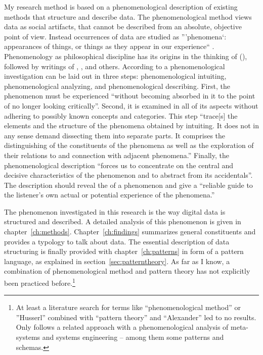 My research method is based on a phenomenological description of existing
methods that structure and describe data. The phenomenological method views
data as social artifacts, that cannot be described from an absolute, objective
point of view. Instead occurrences of data are studied as '''phenomena`:
appearances of things, or things as they appear in our experience``
\cite{Smith2009}.  Phenomenology as philosophical discipline has its origins in
the thinking of  (\citeyear{Husserl1931,Husserl1986}),
followed by writings of ,
,  and others.
According to \textcite[681ff.]{Spiegelberg1982} a phenomenological
investigation can be laid out in three steps: phenomenological intuiting,
phenomenological analyzing, and phenomenological describing. First, the
phenomenon must be experienced ``without becoming absorbed in it to the point
of no longer looking critically''. Second, it is examined in all of its aspects
without adhering to possibly known concepts and categories. This step
``trace[s] the elements and the structure of the phenomena obtained by
intuiting. It does not in any sense demand dissecting them into separate parts.
It comprises the distinguishing of the constituents of the phenomena as well as
the exploration of their relations to and connection with adjacent phenomena.''
Finally, the phenomenological description ``forces us to concentrate on the
central and decisive characteristics of the phenomenon and to abstract from its
accidentals''. The description should reveal the  of a phenomenon
and give a ``reliable guide to the listener’s own actual or potential
experience of the phenomena.''


The phenomenon investigated in this research is the way digital data is
structured and described. A detailed analysis of this phenomenon is given in
chapter~\ref{ch:methods}.  Chapter~\ref{ch:findings} summarizes general
constituents and provides a typology to talk about data. The essential
description of data structuring is finally provided with
chapter~\ref{ch:patterns} in form of a pattern language, as explained in
section~\ref{sec:patterntheory}.  As far as I know, a combination of
phenomenological method and pattern theory has not explicitly been practiced
before.\footnote{At least a literature search for terms like ``phenomenological method''
or ''Husserl'' combined with ``pattern theory'' and ``Alexander'' led to no
results. Only \textcite{Palmer2009} follows a related approach with a
phenomenological analysis of meta-systems and systems engineering -- among 
them some patterns and schemas.}

